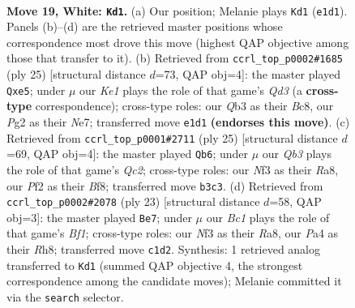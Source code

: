 \documentclass[11pt]{article}
\begin{document}
\clearpage

\begin{figure}[p]\centering
\begin{subfigure}{0.46\textwidth}\centering
\resizebox{\linewidth}{!}{%
\newchessgame
\chessboard[
  setfen={r1bk1b1r/pp4pp/2p5/q2p1p2/P2P4/1Q2PN1P/1P3PP1/1RB1K2R w K - 1 19},
  showmover=false,
  pgfstyle=straightmove, color=movearrow, markmove={e1-d1}
]}
\caption{}
\end{subfigure}\hfill
\begin{subfigure}{0.46\textwidth}\centering
\resizebox{\linewidth}{!}{%
\newchessgame
\chessboard[
  setfen={r1b1k2r/p1p1n1p1/1p1q3p/4Pp2/8/2PBP2P/P1QB1PP1/R3K2R b KQkq - 0 13},
  showmover=false,
  pgfstyle=straightmove, color=movearrow, markmove={d6-e5}
]}
\caption{}
\end{subfigure}
\\[4pt]
\begin{subfigure}{0.46\textwidth}\centering
\resizebox{\linewidth}{!}{%
\newchessgame
\chessboard[
  setfen={r3kb1r/ppq2ppp/2p1pn2/8/2BP4/4PQP1/PP1B1P1P/R3K2R b KQkq - 0 13},
  showmover=false,
  pgfstyle=straightmove, color=movearrow, markmove={c7-b6}
]}
\caption{}
\end{subfigure}\hfill
\begin{subfigure}{0.46\textwidth}\centering
\resizebox{\linewidth}{!}{%
\newchessgame
\chessboard[
  setfen={r3kb1r/ppq2ppp/2p1pn2/8/8/3P1QPP/PPP2PB1/R1B1K2R b KQkq - 0 12},
  showmover=false,
  pgfstyle=straightmove, color=movearrow, markmove={f8-e7}
]}
\caption{}
\end{subfigure}
\caption{\textbf{Move 19, White: \texttt{Kd1}.} (a) Our position; Melanie plays \texttt{Kd1} (\texttt{e1d1}). Panels (b)--(d) are the retrieved master positions whose correspondence most drove this move (highest QAP objective among those that transfer to it). (b) Retrieved from \texttt{ccrl\_top\_p0002\#1685} (ply 25) [structural distance $d$=73, QAP obj=4]: the master played \texttt{Qxe5}; under $\mu$ our \emph{Ke1} plays the role of that game's \emph{Qd3} (a \textbf{cross-type} correspondence); cross-type roles: our \emph{Q}b3 as their \emph{B}c8, our \emph{P}g2 as their \emph{N}e7; transferred move \texttt{e1d1} \textbf{(endorses this move)}. (c) Retrieved from \texttt{ccrl\_top\_p0001\#2711} (ply 25) [structural distance $d$=69, QAP obj=4]: the master played \texttt{Qb6}; under $\mu$ our \emph{Qb3} plays the role of that game's \emph{Qc2}; cross-type roles: our \emph{N}f3 as their \emph{R}a8, our \emph{P}f2 as their \emph{B}f8; transferred move \texttt{b3c3}. (d) Retrieved from \texttt{ccrl\_top\_p0002\#2078} (ply 23) [structural distance $d$=58, QAP obj=3]: the master played \texttt{Be7}; under $\mu$ our \emph{Bc1} plays the role of that game's \emph{Bf1}; cross-type roles: our \emph{N}f3 as their \emph{R}a8, our \emph{P}a4 as their \emph{R}h8; transferred move \texttt{c1d2}. Synthesis: 1 retrieved analog transferred to \texttt{Kd1} (summed QAP objective 4, the strongest correspondence among the candidate moves); Melanie committed it via the \texttt{search} selector.}
\label{fig:thought-m36}
\end{figure}
\end{document}
